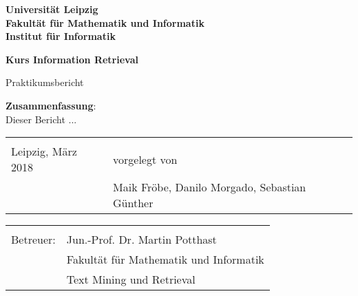 \documentclass[a4paper,ngerman,twoside,BCOR1.5cm,headsepline,DIV12,appendixprefix,final,12pt]{scrartcl}
\begin{document}
\thispagestyle{empty}

\begin{center}
\large

\vspace{1cm}
\textbf{\sffamily	Universität Leipzig\\
			Fakultät für Mathematik und Informatik\\
			Institut für Informatik\\}

\vspace{2cm}
{\Large\textbf{\sffamily Kurs Information Retrieval}}


\large

Praktikumsbericht
\vspace{1cm}
\end{center}

\textbf{Zusammenfassung}:\\
\label{sec:intro}
Dieser Bericht ...

\vfill

{\large
\begin{tabular}{p{7cm} l}
&\\
\small
Leipzig, März 2018 		& \small vorgelegt von\\
				& \small Maik Fröbe, Danilo Morgado, Sebastian Günther\\
\end{tabular}}

\begin{tabular}{p{7cm} l}
&\\
\small
Betreuer: 	& \small Jun.-Prof. Dr. Martin Potthast \\
				& \small Fakultät für Mathematik und Informatik\\
				& \small Text Mining und Retrieval
\end{tabular}


\newpage


\newpage


\newpage


\newpage


\newpage
{}


\end{document}
